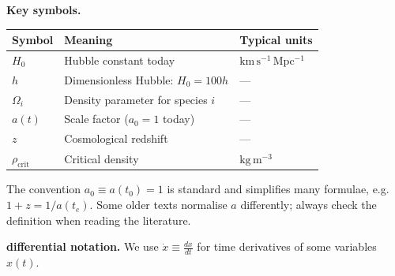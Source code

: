 \bigskip
\noindent\textbf{Key symbols.}
\begin{center}
\begin{tabular}{@{}lll@{}}
  \toprule
  Symbol & Meaning & Typical units \\
  \midrule
  $H_0$                    & Hubble constant today             & $\mathrm{km\,s^{-1}\,Mpc^{-1}}$ \\
  $h$                      & Dimensionless Hubble: $H_0=100h$  & --- \\
  $\Omega_i$               & Density parameter for species $i$ & --- \\
  $a(t)$                   & Scale factor ($a_0 = 1$ today)    & --- \\
  $z$                      & Cosmological redshift             & --- \\
  $\rho_\mathrm{crit}$     & Critical density                  & $\mathrm{kg\,m^{-3}}$ \\
  \bottomrule
\end{tabular}
\end{center}

\begin{remark}
  The convention $a_0 \equiv a(t_0) = 1$ is standard and simplifies many formulae,
  e.g.\ $1+z = 1/a(t_e)$.
  Some older texts normalise $a$ differently; always check the definition
  when reading the literature.
\end{remark}

\bigskip \noindent
\textbf{differential notation.}\quad
We use $\dot{x} \equiv \frac{dx}{dt}$ for time derivatives of some variables $x(t)$.

\clearpage
